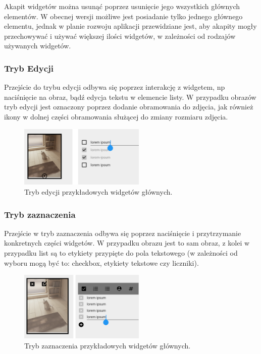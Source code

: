 Akapit widgetów można usunąć poprzez usunięcie jego wszystkich głównych elementów. W obecnej wersji możliwe jest posiadanie tylko jednego głównego elementu, jednak w planie rozwoju aplikacji przewidziane jest, aby akapity mogły przechowywać i używać większej ilości widgetów, w zależności od rodzajów używanych widgetów.

\subsubsection{Tryb Edycji}

Przejście do trybu edycji odbywa się poprzez interakcję z widgetem, np naciśnięcie na obraz, bądź edycja tekstu w elemencie listy.
W przypadku obrazów tryb edycji jest oznaczony poprzez dodanie obramowania do zdjęcia, jak również ikony w dolnej części obramowania służącej do zmiany rozmiaru zdjęcia.

\begin{figure}[ht]
    \centering
    \includegraphics[width=6cm]{images/tryb_edycji.png}
    \caption{Tryb edycji przykładowych widgetów głównych.}
    \label{fig:trybEdycji}
    \vspace{3mm}
\end{figure}

\subsubsection{Tryb zaznaczenia}

Przejście w tryb zaznaczenia odbywa się poprzez naciśnięcie i przytrzymanie konkretnych części widgetów. W przypadku obrazu jest to sam obraz, z kolei w przypadku list są to etykiety przypięte do pola tekstowego (w zależności od wyboru mogą być to: checkbox, etykiety tekstowe czy liczniki).

\begin{figure}[ht]
    \centering
    \includegraphics[width=6cm]{images/tryb_zaznaczenia.png}
    \caption{Tryb zaznaczenia przykładowych widgetów głównych.}
    \label{fig:trybZaznaczenia}
    \vspace{3mm}
\end{figure}



